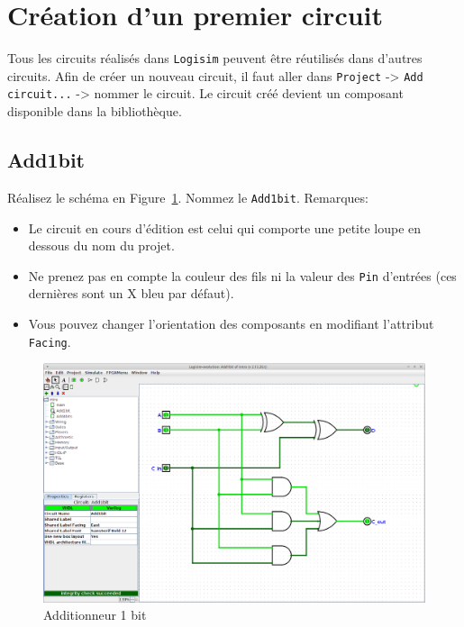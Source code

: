 \documentclass[nosolution]{exercice}
\begin{document}
\section{Création d'un premier circuit}



\label{nouveauCircuit}
Tous les circuits réalisés dans \texttt{Logisim} peuvent être réutilisés dans d'autres circuits.
Afin de créer un nouveau circuit, il faut aller dans \texttt{Project} -> \texttt{Add circuit...} -> nommer le circuit. Le circuit créé devient un composant disponible dans la bibliothèque.

\subsection{Add1bit}
Réalisez le schéma en Figure~\ref{fig_logisim_addOneBit}. Nommez le \texttt{Add1bit}.
Remarques:
\begin{itemize}
\item Le circuit en cours d'édition est celui qui comporte une petite loupe en dessous du nom du projet.
\item Ne prenez pas en compte la couleur des fils ni la valeur des \texttt{Pin} d'entrées (ces dernières sont un X bleu par défaut).
\item Vous pouvez changer l'orientation des composants en modifiant l'attribut \texttt{Facing}.
\end{itemize}

\begin{figure}[H]
\begin{center}
\includegraphics[width=400pt]{images/logisim_add1bit.png}
\caption{\label{fig_logisim_addOneBit}Additionneur 1 bit}
\end{center}
\end{figure}
\end{document}
